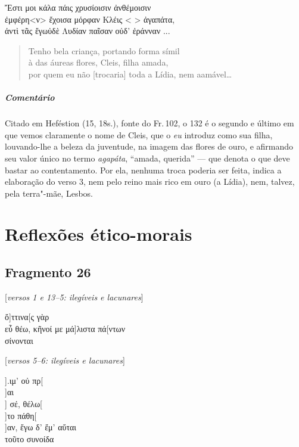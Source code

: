 \begin{gkverse}
Ἔστι μοι κάλα πάις χρυσίοισιν ἀνθέμοισιν\\
ἐμφέρη<ν> ἔχοισα μόρφαν Κλέις <  > ἀγαπάτα,\\
ἀντὶ τᾶς ἔγωὐδὲ Λυδίαν παῖσαν οὐδ’ ἐράνναν ...
\end{gkverse}

\begin{verse}
Tenho bela criança, portando forma símil\\
à das áureas flores, Cleis, filha amada,\\
por quem eu não [trocaria] toda a Lídia, nem a\qb{}amável\ldots{}
\end{verse}

\medskip

{\paragraph{Comentário} Citado em Heféstion (15, 18s.), fonte do Fr.\,102, o 132 é o segundo e último em que vemos claramente o nome de Cleis, que o \emph{eu} introduz como sua filha, louvando-lhe a
beleza da juventude, na imagem das flores de ouro, e afirmando seu valor único no termo \emph{agapáta}, ``amada, querida'' --- que denota o que deve bastar ao contentamento. Por ela, nenhuma troca poderia ser feita, indica a elaboração do verso 3, nem pelo reino mais rico em ouro (a Lídia), nem, talvez, pela terra"-mãe, Lesbos.}



\chapter{Reflexões ético-morais}

\section{Fragmento 26} 

\begin{gkverse}
\textnormal{[\emph{versos 1 e 13--5: ilegíveis e lacunares}]}

ὄ]ττινα[ς γὰρ\\
εὖ θέω, κῆνοί με μά]λιστα πά[ντων\\
σίνονται

\textnormal{[\emph{versos 5--6: ilegíveis e lacunares}]}

           ].ιμ’ οὐ πρ[\\
  ]αι\\
  ] σέ, θέλω[\\
  ]το πάθη[\\
         ]αν, ἔγω δ’ ἔμ’ αὔται\\
τοῦτο συνοίδα
\end{gkverse}


